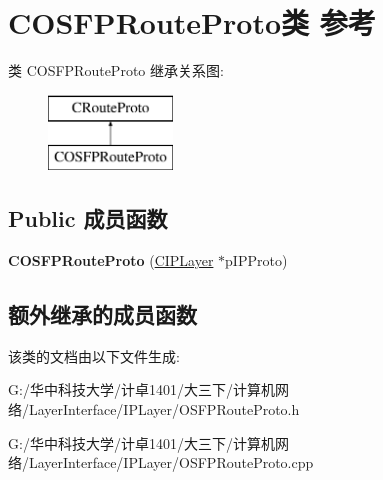 \hypertarget{class_c_o_s_f_p_route_proto}{}\section{C\+O\+S\+F\+P\+Route\+Proto类 参考}
\label{class_c_o_s_f_p_route_proto}
类 C\+O\+S\+F\+P\+Route\+Proto 继承关系图\+:\begin{figure}[H]
\begin{center}
\leavevmode
\includegraphics[height=2.000000cm]{class_c_o_s_f_p_route_proto}
\end{center}
\end{figure}
\subsection*{Public 成员函数}
\begin{DoxyCompactItemize}
\item 
\mbox{\label{class_c_o_s_f_p_route_proto_a4a7e4d4d5c3c6d17fd45a1aca66c628c}} 
{\bfseries C\+O\+S\+F\+P\+Route\+Proto} (\hyperlink{class_c_i_p_layer}{C\+I\+P\+Layer} $\ast$p\+I\+P\+Proto)
\end{DoxyCompactItemize}
\subsection*{额外继承的成员函数}


该类的文档由以下文件生成\+:\begin{DoxyCompactItemize}
\item 
G\+:/华中科技大学/计卓1401/大三下/计算机网络/\+Layer\+Interface/\+I\+P\+Layer/O\+S\+F\+P\+Route\+Proto.\+h\item 
G\+:/华中科技大学/计卓1401/大三下/计算机网络/\+Layer\+Interface/\+I\+P\+Layer/O\+S\+F\+P\+Route\+Proto.\+cpp\end{DoxyCompactItemize}

